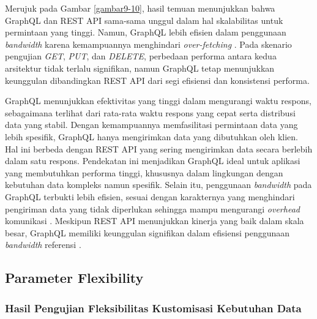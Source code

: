 \documentclass[
 manuscript=article,  %
  layout=publish, 
  year=2024, 
  month= Februari, %
  volume=8,
  number=1 
]{JIKO}
\begin{document}
Merujuk pada Gambar \ref{gambar9-10}, hasil temuan menunjukkan bahwa GraphQL dan REST API sama-sama unggul dalam hal skalabilitas untuk permintaan yang tinggi. Namun, GraphQL lebih efisien dalam penggunaan \textit{bandwidth} karena kemampuannya menghindari \textit{over-fetching} \cite{14,15}. Pada skenario pengujian \textit{GET}, \textit{PUT}, dan \textit{DELETE}, perbedaan performa antara kedua arsitektur tidak terlalu signifikan, namun GraphQL tetap menunjukkan keunggulan dibandingkan REST API dari segi efisiensi dan konsistensi performa.

GraphQL menunjukkan efektivitas yang tinggi dalam mengurangi waktu respons, sebagaimana terlihat dari rata-rata waktu respons yang cepat serta distribusi data yang stabil. Dengan kemampuannya memfasilitasi permintaan data yang lebih spesifik, GraphQL hanya mengirimkan data yang dibutuhkan oleh klien. Hal ini berbeda dengan REST API yang sering mengirimkan data secara berlebih dalam satu respons. Pendekatan ini menjadikan GraphQL ideal untuk aplikasi yang membutuhkan performa tinggi, khususnya dalam lingkungan dengan kebutuhan data kompleks namun spesifik. Selain itu, penggunaan \textit{bandwidth} pada GraphQL terbukti lebih efisien, sesuai dengan karakternya yang menghindari pengiriman data yang tidak diperlukan sehingga mampu mengurangi \textit{overhead} komunikasi \cite{16}. Meskipun REST API menunjukkan kinerja yang baik dalam skala besar, GraphQL memiliki keunggulan signifikan dalam efisiensi penggunaan \textit{bandwidth} referensi \cite{17}.



\subsection{Parameter Flexibility}

\subsubsection{Hasil Pengujian Fleksibilitas Kustomisasi Kebutuhan Data}
\end{document}
